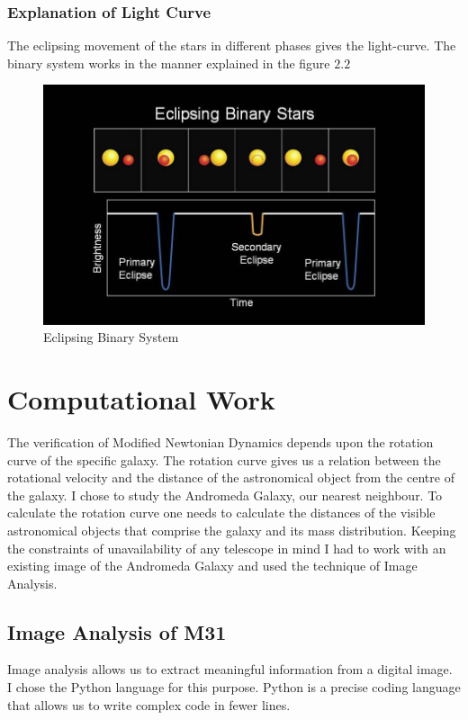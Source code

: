 \subsubsection*{Explanation of Light Curve}

 The eclipsing movement of the stars in different phases gives the light-curve. The binary system works in the manner explained in the figure $2.2$ 
\cite{sys}
\begin{figure} [h]
\centering
\includegraphics[scale=0.5]{Light}
\caption{Eclipsing Binary System}
\end{figure}

\section{Computational Work}
The verification of Modified Newtonian Dynamics depends upon the rotation curve of the specific galaxy. The rotation curve gives us a relation between the rotational velocity and the distance of the astronomical object from the centre of the galaxy. I chose to study the Andromeda Galaxy, our nearest neighbour. To calculate the rotation curve one needs to calculate the distances of the visible astronomical objects that comprise the galaxy and its mass distribution. Keeping the constraints of unavailability of any telescope in mind I had to work with an existing image of the Andromeda Galaxy and used the technique of Image Analysis.

\subsection{Image Analysis of M31}

Image analysis allows us to extract meaningful information from a digital image. I chose the Python language for this purpose. Python is a precise coding language that allows us to write complex code in fewer lines.

